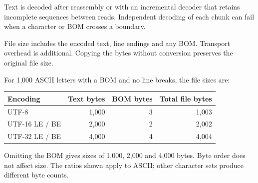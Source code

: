 \documentclass[10pt,a4paper]{article}
\newcommand{\topic}[1]{\vspace{5pt}{\large\bfseries #1}\par}
\begin{document}
Text is decoded after reassembly or with an incremental decoder that retains incomplete sequences between reads. Independent decoding of each chunk can fail when a character or BOM crosses a boundary.

\topic{6. File size}
File size includes the encoded text, line endings and any BOM. Transport overhead is additional. Copying the bytes without conversion preserves the original file size.

For 1,000 ASCII letters with a BOM and no line breaks, the file sizes are:

\begin{center}
\begin{tabular}{@{}lrrr@{}}
\toprule
Encoding & Text bytes & BOM bytes & Total file bytes\\
\midrule
UTF-8 & 1,000 & 3 & 1,003\\
UTF-16 LE / BE & 2,000 & 2 & 2,002\\
UTF-32 LE / BE & 4,000 & 4 & 4,004\\
\bottomrule
\end{tabular}
\end{center}

Omitting the BOM gives sizes of 1,000, 2,000 and 4,000 bytes. Byte order does not affect size. The ratios shown apply to ASCII; other character sets produce different byte counts.
\end{document}
